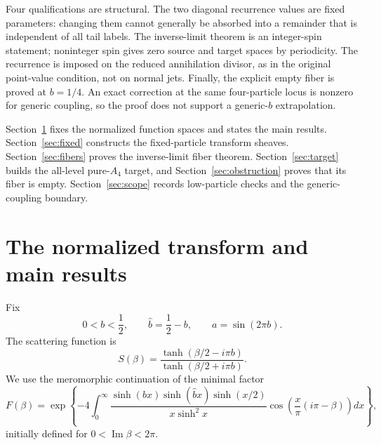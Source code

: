 \documentclass[11pt,reqno]{amsart}
\theoremstyle{definition}
\theoremstyle{remark}
\begin{document}
Four qualifications are structural.  The two diagonal recurrence values are
fixed parameters: changing them cannot generally be absorbed into a remainder
that is independent of all tail labels.  The inverse-limit theorem is an
integer-spin statement; noninteger spin gives zero source and target spaces by
periodicity.  The recurrence is imposed on the reduced annihilation divisor,
as in the original point-value condition, not on normal jets.  Finally, the
explicit empty fiber is proved at $b=1/4$.  An exact correction at the same
four-particle locus is nonzero for generic coupling, so the proof does not
support a generic-$b$ extrapolation.

Section~\ref{sec:setup} fixes the normalized function spaces and states the
main results.  Section~\ref{sec:fixed} constructs the fixed-particle transform
sheaves.  Section~\ref{sec:fibers} proves the inverse-limit fiber theorem.
Section~\ref{sec:target} builds the all-level pure-$A_4$ target, and
Section~\ref{sec:obstruction} proves that its fiber is empty.
Section~\ref{sec:scope} records low-particle checks and the generic-coupling
boundary.

\section{The normalized transform and main results}
\label{sec:setup}

Fix
\begin{equation}
 0<b<\frac12,
 \qquad \widehat b=\frac12-b,
 \qquad a=\sin(2\pi b).
 \label{eq:parameters}
\end{equation}
The scattering function is
\begin{equation}
 S(\beta)=
 \frac{\tanh(\beta/2-i\pi b)}{\tanh(\beta/2+i\pi b)}.
 \label{eq:S}
\end{equation}
We use the meromorphic continuation of the minimal factor
\begin{equation}
 F(\beta)=\exp\!\left\{-4\int_0^\infty
 \frac{\sinh(bx)\sinh(\widehat b x)\sinh(x/2)}
 {x\sinh^2x}
 \cos\!\left(\frac{x}{\pi}(i\pi-\beta)\right)dx\right\},
 \label{eq:F}
\end{equation}
initially defined for $0<\operatorname{Im}\beta<2\pi$.
\end{document}
